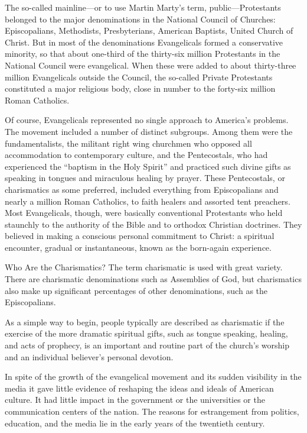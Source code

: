 The so-called mainline—or to use Martin Marty’s term, public—Protestants belonged to the major
denominations in the National Council of Churches: Episcopalians, Methodists, Presbyterians,
American Baptists, United Church of Christ. But in most of the denominations Evangelicals formed a
conservative minority, so that about one-third of the thirty-six million Protestants in the National
Council were evangelical. When these were added to about thirty-three million Evangelicals outside
the Council, the so-called Private Protestants constituted a major religious body, close in number
to the forty-six million Roman Catholics.

Of course, Evangelicals represented no single approach to America’s problems. The movement included
a number of distinct subgroups. Among them were the fundamentalists, the militant right wing
churchmen who opposed all accommodation to contemporary culture, and the Pentecostals, who had
experienced the “baptism in the Holy Spirit” and practiced such divine gifts as speaking in tongues
and miraculous healing by prayer. These Pentecostals, or charismatics as some preferred, included
everything from Episcopalians and nearly a million Roman Catholics, to faith healers and assorted
tent preachers. Most Evangelicals, though, were basically conventional Protestants who held
staunchly to the authority of the Bible and to orthodox Christian doctrines. They believed in making
a conscious personal commitment to Christ: a spiritual encounter, gradual or instantaneous, known as
the born-again experience.

\begin{sidebar}{Who Are the Charismatics?}
The term charismatic is used with great variety. There are charismatic denominations such as
Assemblies of God, but charismatics also make up significant percentages of other denominations,
such as the Episcopalians.

As a simple way to begin, people typically are described as charismatic if the exercise of the more
dramatic spiritual gifts, such as tongue speaking, healing, and acts of prophecy, is an important
and routine part of the church’s worship and an individual believer’s personal devotion.
\end{sidebar}

In spite of the growth of the evangelical movement and its sudden visibility in the media it gave
little evidence of reshaping the ideas and ideals of American culture. It had little impact in the
government or the universities or the communication centers of the nation. The reasons for
estrangement from politics, education, and the media lie in the early years of the twentieth
century.

